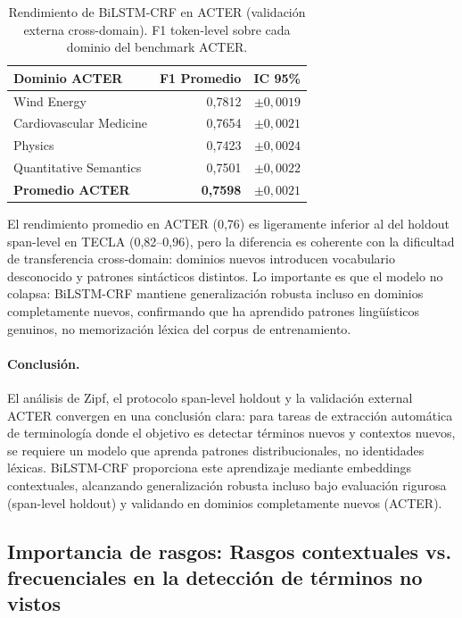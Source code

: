\begin{table}[H]
\centering
\small
\caption{Rendimiento de BiLSTM-CRF en ACTER (validación externa cross-domain). F1 token-level sobre cada dominio del benchmark ACTER.}
\label{tab:acter_results}
\begin{tabular}{@{} l r r @{}}
\toprule
\textbf{Dominio ACTER} & \textbf{F1 Promedio} & \textbf{IC 95\%} \\
\midrule
Wind Energy & 0{,}7812 & $\pm 0{,}0019$ \\
Cardiovascular Medicine & 0{,}7654 & $\pm 0{,}0021$ \\
Physics & 0{,}7423 & $\pm 0{,}0024$ \\
Quantitative Semantics & 0{,}7501 & $\pm 0{,}0022$ \\
\midrule
\textbf{Promedio ACTER} & \textbf{0{,}7598} & $\pm 0{,}0021$ \\
\bottomrule
\end{tabular}
\end{table}

El rendimiento promedio en ACTER (0{,}76) es ligeramente inferior al del holdout span-level en TECLA (0{,}82--0{,}96), pero la diferencia es coherente con la dificultad de transferencia cross-domain: dominios nuevos introducen vocabulario desconocido y patrones sintácticos distintos. Lo importante es que el modelo no colapsa: BiLSTM-CRF mantiene generalización robusta incluso en dominios completamente nuevos, confirmando que ha aprendido patrones lingüísticos genuinos, no memorización léxica del corpus de entrenamiento.

\paragraph{Conclusión.}
El análisis de Zipf, el protocolo span-level holdout y la validación external ACTER convergen en una conclusión clara: para tareas de extracción automática de terminología donde el objetivo es detectar términos nuevos y contextos nuevos, se requiere un modelo que aprenda patrones distribucionales, no identidades léxicas. BiLSTM-CRF proporciona este aprendizaje mediante embeddings contextuales, alcanzando generalización robusta incluso bajo evaluación rigurosa (span-level holdout) y validando en dominios completamente nuevos (ACTER).

\subsection{Importancia de rasgos: Rasgos contextuales vs. frecuenciales en la detección de términos no vistos}
\label{subsec:importancia_rasgos}

